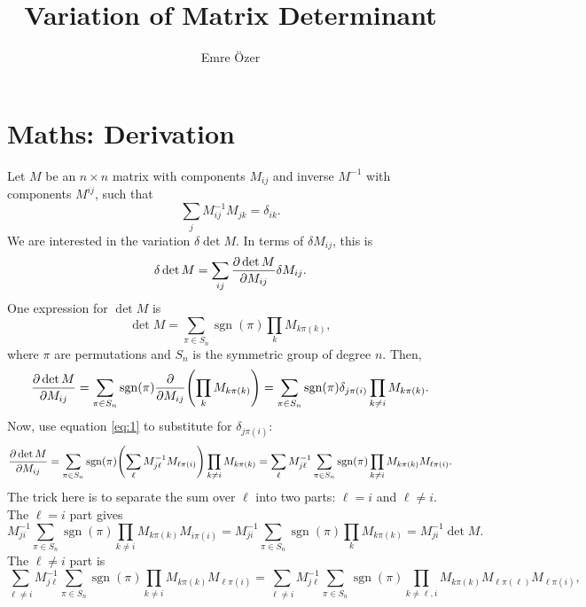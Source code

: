 \documentclass{article}
\title{Variation of Matrix Determinant}
\date{}
\author{Emre Özer}
\DeclareMathOperator{\sgn}{sgn}
\begin{document}
	\maketitle
	\tableofcontents
\section{Maths: Derivation}
Let $ M $ be an $ n \times n $ matrix with components $ M_{ij} $ and inverse $ M^{-1} $ with components $ M^{ij} $, such that
\begin{equation} \label{eq:1}
	\sum_{j} M^{-1}_{ij}M_{jk} = \delta_{ik}.
\end{equation}
We are interested in the variation $ \delta \det M $. In terms of $ \delta M_{ij} $, this is
\begin{equation}
	\delta \det M = \sum_{ij} \pdv{\det M}{M_{ij}} \delta M_{ij}.
\end{equation}
One expression for $ \det M $ is
\begin{equation}
	\det M  = \sum_{\pi \in S_{n}} \sgn(\pi) \prod_{k} M_{k\pi(k)},
\end{equation}
where $ \pi $ are permutations and $ S_{n} $ is the symmetric group of degree $ n $. Then,
\begin{equation}
	\pdv{\det M}{M_{ij}} = \sum_{\pi \in S_{n}} \sgn(\pi) \pdv{M_{ij}}(\prod_{k} M_{k\pi(k)}) = \sum_{\pi \in S_{n}} \sgn(\pi) \delta_{j\pi(i)} \prod_{k\neq i} M_{k\pi(k)}.
\end{equation}
Now, use equation \eqref{eq:1} to substitute for $ \delta_{j \pi(i)} $:
\begin{equation}
	\pdv{\det M}{M_{ij}} = \sum_{\pi \in S_{n}} \sgn(\pi) \qty(\sum_{\ell} M^{-1}_{j \ell} M_{\ell \pi(i)} )  \prod_{k\neq i} M_{k\pi(k)} = \sum_{\ell} M^{-1}_{j\ell} \sum_{\pi \in S_{n}} \sgn(\pi) \prod_{k\neq i} M_{k\pi(k)} M_{\ell \pi(i)}.
\end{equation}
The trick here is to separate the sum over $ \ell $ into two parts: $ \ell = i $ and $ \ell \neq i $. The $ \ell = i $ part gives
\begin{equation}
	M^{-1}_{ji} \sum_{\pi \in S_{n}} \sgn(\pi) \prod_{k\neq i} M_{k \pi(k)} M_{i \pi(i)} = 	M^{-1}_{ji} \sum_{\pi \in S_{n}} \sgn(\pi) \prod_{k} M_{k \pi(k)} = M^{-1}_{ji} \det M.
\end{equation}
The $ \ell \neq i $ part is
\begin{equation} \label{eq:7}
	\sum_{\ell \neq i} M^{-1}_{j\ell} \sum_{\pi \in S_{n}} \sgn(\pi) \prod_{k\neq i} M_{k\pi(k)} M_{\ell \pi(i)} = \sum_{\ell \neq i} M^{-1}_{j\ell} \sum_{\pi \in S_{n}} \sgn(\pi) \prod_{k\neq \ell, i} M_{k\pi(k)} M_{\ell \pi(\ell)} M_{\ell \pi(i)},
\end{equation}
\end{document}
